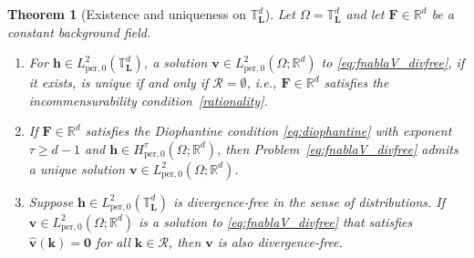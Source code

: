 \documentclass[12pt]{article}
\newtheorem{theorem}{Theorem}
\begin{document}
\begin{theorem}[Existence and uniqueness on $\mathbb{T}^d_{\boldsymbol{L}}$]
\label{thm:exist-unique}
Let $\Omega=\mathbb{T}^d_{\boldsymbol{L}}$ and let $\mathbf{F} \in \mathbb{R}^d$ be a constant background field.

\begin{enumerate}
\item[(i)] 
For $\boldsymbol{h} \in L^2_{\mathrm{per},0}(\mathbb{T}^d_{\boldsymbol{L}})$, a solution $\boldsymbol{v} \in L^2_{\mathrm{per},0}(\Omega; \mathbb{R}^d)$ to \eqref{eq:fnablaV_divfree}, if it exists,  is unique if and only if $\mathcal{R}=\emptyset$, i.e., $\mathbf{F} \in \mathbb{R}^d$ satisfies the incommensurability condition~\eqref{rationality}.


\item[(ii)]  If $\mathbf{F} \in \mathbb{R}^d$ satisfies the Diophantine condition \eqref{eq:diophantine} with exponent $\tau\geq d-1$ and $\boldsymbol{h} \in H^{\tau}_{\mathrm{per},0}(\Omega; \mathbb{R}^d)$, then
Problem~\eqref{eq:fnablaV_divfree} admits a unique solution $\boldsymbol{v} \in L^2_{\mathrm{per},0}(\Omega; \mathbb{R}^d)$.


\item[(iii)] Suppose $\boldsymbol{h}\in L^2_{\mathrm{per},0}(\mathbb{T}^d_{\boldsymbol{L}})$ is divergence-free in the sense of distributions. If $\boldsymbol{v} \in L^2_{\mathrm{per},0}(\Omega; \mathbb{R}^d)$ is a solution to \eqref{eq:fnablaV_divfree} that satisfies $\hat{\boldsymbol{v}}(\boldsymbol{k}) = \boldsymbol{0}$ for all $\boldsymbol{k} \in \mathcal{R}$, then $\boldsymbol{v}$ is also divergence-free.
\end{enumerate}
\end{theorem}
\end{document}
